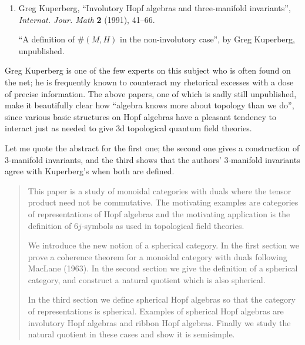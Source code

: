 \documentclass[12pt]{article}
\renewcommand{\texttt}[1]{%
  \begingroup
  \ttfamily
  \begingroup\lccode`~=`/\lowercase{\endgroup\def~}{/\discretionary{}{}{}}%
  \begingroup\lccode`~=`[\lowercase{\endgroup\def~}{[\discretionary{}{}{}}%
  \begingroup\lccode`~=`.\lowercase{\endgroup\def~}{.\discretionary{}{}{}}%
  \catcode`/=\active\catcode`[=\active\catcode`.=\active
  \scantokens{#1\noexpand}%
  \endgroup
}
\begin{document}
\begin{enumerate}
\def\labelenumi{\arabic{enumi})}
\setcounter{enumi}{2}
\item
  Greg Kuperberg, ``Involutory Hopf algebras and three-manifold
  invariants'', \emph{Internat. Jour. Math} \textbf{2} (1991), 41--66.

  ``A definition of \(\#(M,H)\) in the non-involutory case'', by Greg
  Kuperberg, unpublished.
\end{enumerate}
\noindent
Greg Kuperberg is one of the few experts on this subject who is often
found on the net; he is frequently known to counteract my rhetorical
excesses with a dose of precise information. The above papers, one of
which is sadly still unpublished, make it beautifully clear how
``algebra knows more about topology than we do'', since various basic
structures on Hopf algebras have a pleasant tendency to interact just as
needed to give 3d topological quantum field theories.

\noindent
Let me quote the abstract for the first one; the second one gives a
construction of 3-manifold invariants, and the third shows that the
authors' 3-manifold invariants agree with Kuperberg's when both are
defined.

\begin{quote}
This paper is a study of monoidal categories with duals where the tensor
product need not be commutative. The motivating examples are categories
of representations of Hopf algebras and the motivating application is
the definition of \(6j\)-symbols as used in topological field theories.

We introduce the new notion of a spherical category. In the first
section we prove a coherence theorem for a monoidal category with duals
following MacLane (1963). In the second section we give the definition
of a spherical category, and construct a natural quotient which is also
spherical.

In the third section we define spherical Hopf algebras so that the
category of representations is spherical. Examples of spherical Hopf
algebras are involutory Hopf algebras and ribbon Hopf algebras. Finally
we study the natural quotient in these cases and show it is semisimple.
\end{quote}
\end{document}
